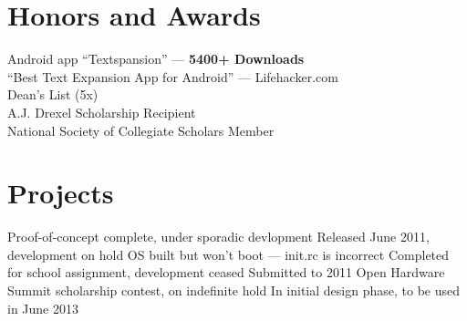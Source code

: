 \documentclass[10pt]{barag_resume}
\begin{document}
	\newpage
	\section{Honors and Awards}%
		Android app ``Textspansion'' --- \textbf{5400+ Downloads}\\ {\setlength{\parindent}{1em}
			\indent ``Best Text Expansion App for Android'' --- Lifehacker.com\\
		Dean's List (5x)\\
		A.J. Drexel Scholarship Recipient\\
		National Society of Collegiate Scholars Member}


	\section{Projects}%
			{Proof-of-concept complete, under sporadic devlopment}
			{Released June 2011, development on hold}
			{OS built but won't boot --- init.rc is incorrect}
			{Completed for school assignment, development ceased}
			{Submitted to 2011 Open Hardware Summit scholarship contest, on indefinite hold}
			{In initial design phase, to be used in June 2013}
\end{document}
